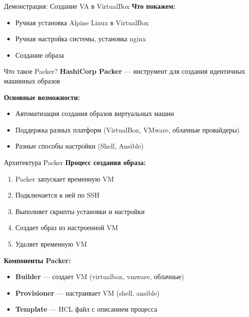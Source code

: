 \documentclass[aspectratio=169]{beamer}
\begin{document}
    \begin{frame}{Демонстрация: Создание VA в VirtualBox}
        \textbf{Что покажем:}
        \begin{itemize}
            \item Ручная установка Alpine Linux в VirtualBox
            \item Ручная настройка системы, установка nginx
            \item Создание образа
        \end{itemize}
    \end{frame}

    \begin{frame}{Что такое Packer?}
        \textbf{HashiCorp Packer} — инструмент для создания идентичных машинных образов
        
        \vspace{0.5cm}
        
        \textbf{Основные возможности:}
        \begin{itemize}
            \item Автоматизация создания образов виртуальных машин
            \item Поддержка разных платформ (VirtualBox, VMware, облачные провайдеры)
            \item Разные способы настройки (Shell, Ansible)
        \end{itemize}
    \end{frame}

    \begin{frame}{Архитектура Packer}
        \textbf{Процесс создания образа:}
        
        \begin{enumerate}
            \item Packer запускает временную VM
            \item Подключается к ней по SSH
            \item Выполняет скрипты установки и настройки
            \item Создает образ из настроенной VM
            \item Удаляет временную VM
        \end{enumerate}
        
        \vspace{0.5cm}
        
        \textbf{Компоненты Packer:}
        \begin{itemize}
            \item \textbf{Builder} — создает VM (virtualbox, vmware, облачные)
            \item \textbf{Provisioner} — настраивает VM (shell, ansible)
            \item \textbf{Template} — HCL файл с описанием процесса
        \end{itemize}
    \end{frame}
\end{document}
